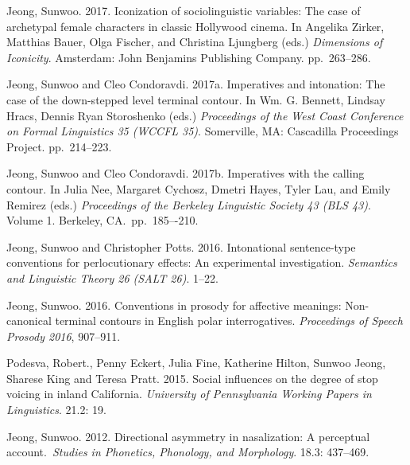 \documentclass[letterpaper]{article}
\renewenvironment{itemize}{
  \begin{list}{}{
    \setlength{\leftmargin}{1.5em}
  }
}{
  \end{list}
}
\begin{document}
\begin{itemize}
\item Jeong, Sunwoo. 2017. Iconization of sociolinguistic variables: The case of archetypal female characters in classic Hollywood cinema. In Angelika Zirker, Matthias Bauer, Olga Fischer, and Christina Ljungberg (eds.) \emph{Dimensions of Iconicity}. Amsterdam: John Benjamins Publishing Company. pp.~263--286.

\item Jeong, Sunwoo and Cleo Condoravdi. 2017a. Imperatives and intonation: The case of the down-stepped level terminal contour. In Wm. G. Bennett, Lindsay Hracs, Dennis Ryan Storoshenko (eds.) \emph{Proceedings of the West Coast Conference on Formal Linguistics 35 (WCCFL 35)}. Somerville, MA: Cascadilla Proceedings Project. pp.~214--223. 

\item Jeong, Sunwoo and Cleo Condoravdi. 2017b. Imperatives with the calling contour. In Julia Nee, Margaret Cychosz, Dmetri Hayes, Tyler Lau, and Emily Remirez (eds.) \emph{Proceedings of the Berkeley Linguistic Society 43 (BLS 43)}. Volume 1. Berkeley, CA.\ pp.~185–-210.

\item Jeong, Sunwoo and Christopher Potts. 2016. Intonational sentence-type conventions for perlocutionary effects: An experimental investigation. \emph{Semantics and Linguistic Theory 26 (SALT 26)}. 1--22.

\item Jeong, Sunwoo. 2016. Conventions in prosody for affective meanings: Non-canonical terminal contours in English polar interrogatives. \emph{Proceedings of Speech Prosody 2016}, 907--911.

\item Podesva, Robert., Penny Eckert, Julia Fine, Katherine Hilton, Sunwoo Jeong, Sharese King and Teresa Pratt. 2015. Social influences on the degree of stop voicing in inland California. \emph{University of Pennsylvania Working Papers in Linguistics}. 21.2: 19.

\item Jeong, Sunwoo. 2012. Directional asymmetry in nasalization: A perceptual account.\ \emph{Studies in Phonetics, Phonology, and Morphology}. 18.3: 437--469.

\end{itemize}


\end{document}

